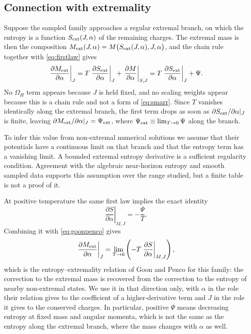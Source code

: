 \documentclass[11pt,a4paper]{article}
\begin{document}
\subsection{Connection with extremality}

Suppose the sampled family approaches a regular extremal branch, on which the
entropy is a function $S_{\mathrm{ext}}(J,\alpha)$ of the remaining charges. The
extremal mass is then the composition
$M_{\mathrm{ext}}(J,\alpha)=M\bigl(S_{\mathrm{ext}}(J,\alpha),J,\alpha\bigr)$, and the chain rule
together with \eqref{eq:firstlaw} gives
\begin{equation}
 \left.\frac{\partial M_{\mathrm{ext}}}{\partial\alpha}\right|_J
 =T\left.\frac{\partial S_{\mathrm{ext}}}{\partial\alpha}\right|_J
 +\left.\frac{\partial M}{\partial\alpha}\right|_{S,J}
 =T\left.\frac{\partial S_{\mathrm{ext}}}{\partial\alpha}\right|_J+\Psi .
 \label{eq:goonpenco}
\end{equation}
No $\Omega_H$ term appears because $J$ is held fixed, and no scaling weights
appear because this is a chain rule and not a form of \eqref{eq:smarr}.
Since $T$ vanishes identically along the extremal branch, the first term
drops as soon as $\partial S_{\mathrm{ext}}/\partial\alpha|_J$ is finite, leaving
$\partial M_{\mathrm{ext}}/\partial\alpha|_J=\Psi_{\mathrm{ext}}$, where
$\Psi_{\mathrm{ext}}\equiv\lim_{T\to0}\Psi$ along the branch.

To infer this value from non-extremal numerical solutions we assume that
their potentials have a continuous limit on that branch and that the
entropy term has a vanishing limit. A bounded extremal entropy derivative
is a sufficient regularity condition. Agreement with the algebraic
near-horizon entropy and smooth sampled data supports this assumption
over the range studied, but a finite table is not a proof of it.

At positive temperature the same first law implies the exact identity
\begin{equation*}
 \left.\frac{\partial S}{\partial\alpha}\right|_{M,J}
 =-\frac{\Psi}{T}.
\end{equation*}
Combining it with \eqref{eq:goonpenco} gives
\begin{equation*}
 \left.\frac{\partial M_{\mathrm{ext}}}{\partial\alpha}\right|_J
 =\lim_{T\to0}\left(-T\left.\frac{\partial S}{\partial\alpha}\right|_{M,J}\right),
\end{equation*}
which is the entropy--extremality relation of Goon and Penco
\cite{Goon:2019faz} for this family: the correction to the extremal mass is
recovered from the correction to the entropy of nearby non-extremal states.
We use it in that direction only, with $\alpha$ in the role their relation
gives to the coefficient of a higher-derivative term and $J$ in the role it
gives to the conserved charges. In particular, positive $\Psi$ means decreasing
entropy at fixed mass and angular momenta, which is not the same as the entropy
along the extremal branch, where the mass changes with $\alpha$ as well.
\end{document}
